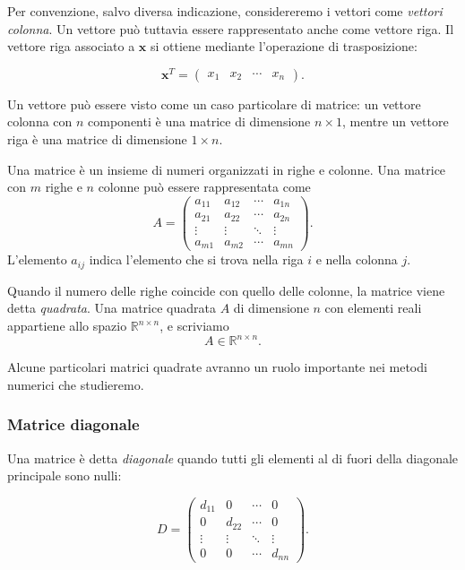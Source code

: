 Per convenzione, salvo diversa indicazione, considereremo i vettori
come \emph{vettori colonna}. Un vettore può tuttavia essere
rappresentato anche come vettore riga. Il vettore riga associato a
$\mathbf{x}$ si ottiene mediante l'operazione di trasposizione:

\begin{equation*}
\mathbf{x}^T =
\begin{pmatrix}
x_1 & x_2 & \cdots & x_n
\end{pmatrix}.
\end{equation*}

Un vettore può essere visto come un caso particolare di matrice:
un vettore colonna con $n$ componenti è una matrice di dimensione
$n\times 1$, mentre un vettore riga è una matrice di dimensione
$1\times n$.

Una matrice è un insieme di numeri organizzati in righe e colonne.
Una matrice con $m$ righe e $n$ colonne può essere rappresentata come
\begin{equation*}
A =
\begin{pmatrix}
a_{11} & a_{12} & \cdots & a_{1n} \\
a_{21} & a_{22} & \cdots & a_{2n} \\
\vdots & \vdots & \ddots & \vdots \\
a_{m1} & a_{m2} & \cdots & a_{mn}
\end{pmatrix}.
\end{equation*}
L'elemento $a_{ij}$ indica l'elemento che si trova nella riga $i$
e nella colonna $j$.

Quando il numero delle righe coincide con quello delle colonne,
la matrice viene detta \emph{quadrata}. 
Una matrice quadrata $A$ di dimensione $n$ con elementi reali
appartiene allo spazio $\mathbb{R}^{n\times n}$, e scriviamo
\begin{equation*}
A \in \mathbb{R}^{n\times n}.
\end{equation*}

Alcune particolari matrici quadrate avranno un ruolo importante
nei metodi numerici che studieremo.


\subsubsection{Matrice diagonale}

Una matrice è detta \emph{diagonale} quando tutti gli elementi
al di fuori della diagonale principale sono nulli:

\begin{equation*}
D =
\begin{pmatrix}
d_{11} & 0      & \cdots & 0 \\
0      & d_{22} & \cdots & 0 \\
\vdots & \vdots & \ddots & \vdots \\
0      & 0      & \cdots & d_{nn}
\end{pmatrix}.
\end{equation*}


